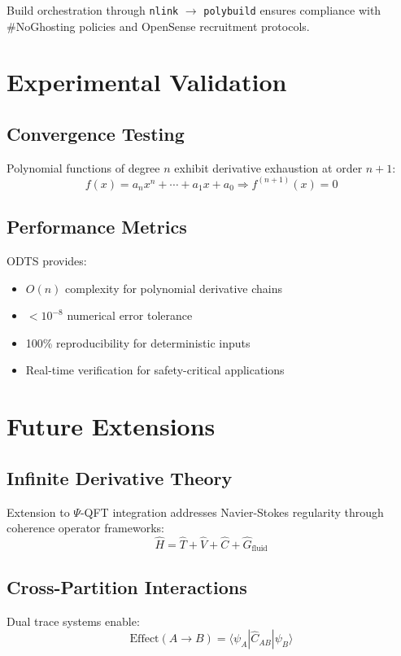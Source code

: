 \documentclass[12pt,a4paper]{article}
\begin{document}
Build orchestration through \texttt{nlink} $\rightarrow$ \texttt{polybuild} ensures compliance with \#NoGhosting policies and OpenSense recruitment protocols.

\section{Experimental Validation}

\subsection{Convergence Testing}

Polynomial functions of degree $n$ exhibit derivative exhaustion at order $n+1$:
\[f(x) = a_n x^n + \cdots + a_1 x + a_0 \Rightarrow f^{(n+1)}(x) = 0\]

\subsection{Performance Metrics}

ODTS provides:
\begin{itemize}
\item $O(n)$ complexity for polynomial derivative chains
\item $< 10^{-8}$ numerical error tolerance  
\item 100\% reproducibility for deterministic inputs
\item Real-time verification for safety-critical applications
\end{itemize}

\section{Future Extensions}

\subsection{Infinite Derivative Theory}

Extension to $\Psi$-QFT integration addresses Navier-Stokes regularity through coherence operator frameworks:
\[\hat{H} = \hat{T} + \hat{V} + \hat{C} + \hat{G}_{\text{fluid}}\]

\subsection{Cross-Partition Interactions}

Dual trace systems enable:
\[\text{Effect}(A \rightarrow B) = \langle \psi_A | \hat{C}_{AB} | \psi_B \rangle\]
\end{document}

